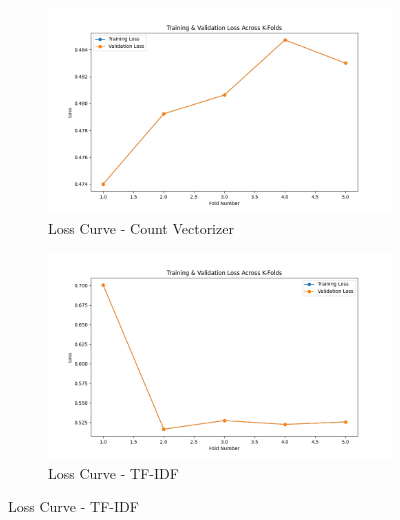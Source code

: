 \begin{figure}[H]
    \centering
    \begin{subfigure}[b]{0.48\textwidth}
        \includegraphics[width=\textwidth]{img/report_info/img/2.2.MLP/best_mlp_count_loss.png}
        \caption{Loss Curve - Count Vectorizer}
        \label{fig:mlp-count-loss}
    \end{subfigure}
    \begin{subfigure}[b]{0.48\textwidth}
        \includegraphics[width=\textwidth]{img/report_info/img/2.2.MLP/best_mlp_tfidf_loss.png}
        \caption{Loss Curve - TF-IDF}
        \label{fig:mlp-tfidf-loss}
    \end{subfigure}
    

\end{figure}
